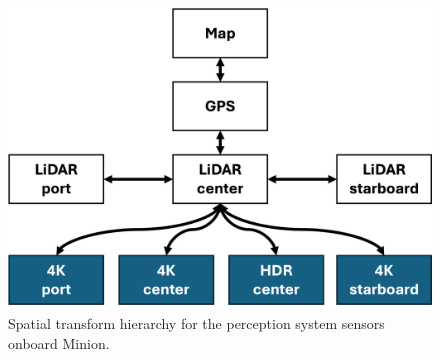 \documentclass{erauthesis}
\begin{document}



\begin{figure}[htbp]
    \centering
    \includegraphics[width=0.7\linewidth]{Images/tf_tree_1.png}
    \caption{Spatial transform hierarchy for the perception system sensors onboard Minion.}
    \label{fig:tf_tree}
\end{figure}
\end{document}
